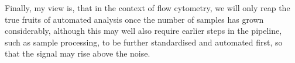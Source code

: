Finally, my view is, that in the context of flow cytometry, we will only reap the true fruits of automated analysis once the number of samples has grown considerably, although this may well also require earlier steps in the pipeline, such as sample processing, to be further standardised and automated first, so that the signal may rise above the noise.




%
%









